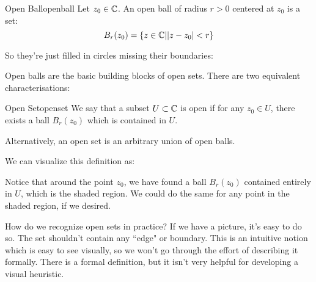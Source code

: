\begin{defbo}{Open Ball}{openball}
Let $z_0\in \mathbb{C}$. An open ball of radius $r > 0$ centered at $z_0$ is a set:
$$B_r(z_0) = \{z\in \mathbb{C}| |z-z_0|< r\}$$
\end{defbo}

So they're just filled in circles missing their boundaries:

\begin{center}
\end{center}

Open balls are the basic building blocks of open sets. There are two equivalent characterisations:

\begin{defbo}{Open Set}{openset}
We say that a subset $U \subset \mathbb{C}$ is open if for any $z_0 \in U$, there exists a ball $B_r(z_0)$ which is contained in $U$.

Alternatively, an open set is an arbitrary union of open balls.
\end{defbo}

We can visualize this definition as:

\begin{center}
\end{center}

Notice that around the point $z_0$, we have found a ball $B_r(z_0)$ contained entirely in $U$, which is the shaded region. We could do the same for any point in the shaded region, if we desired.

How do we recognize open sets in practice? If we have a picture, it's easy to do so. The set shouldn't contain any ``edge" or boundary. This is an intuitive notion which is easy to see visually, so we won't go through the effort of describing it formally. There is a formal definition, but it isn't very helpful for developing a visual heuristic.

